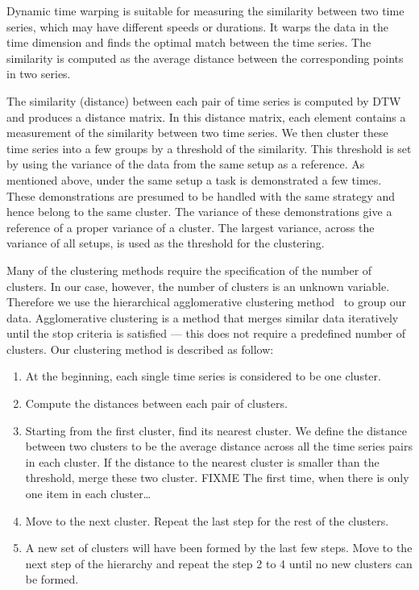 Dynamic time warping is suitable for measuring the similarity between
two time series, which may have different speeds or durations. It
warps the data in the time dimension and finds the optimal match
between the time series. The similarity is computed as the average
distance between the corresponding points in two series.

The similarity (distance) between each pair of time series is computed
by DTW and produces a distance matrix. In this distance matrix, each
element contains a measurement of the similarity between two time
series. We then cluster these time series into a few groups by a
threshold of the similarity. This threshold is set by using the
variance of the data from the same setup as a reference. As mentioned
above, under the same setup a task is demonstrated a few times. These
demonstrations are presumed to be handled with the same strategy and
hence belong to the same cluster. The variance of these demonstrations
give a reference of a proper variance of a cluster. The largest
variance, across the variance of all setups, is used as the threshold
for the clustering.  %

Many of the clustering methods require the specification of the number
of clusters. In our case, however, the number of clusters is an
unknown variable. Therefore we use the hierarchical agglomerative
clustering method~\citep{willett1988recent} to group our
data. Agglomerative clustering is a method that merges similar data
iteratively until the stop criteria is satisfied --- this does not
require a predefined number of clusters. Our clustering method is
described as follow:

\begin{enumerate}
\item At the beginning, each single time series is considered to be one cluster.
\item Compute the distances between each pair of clusters.
\item Starting from the first cluster, find its nearest cluster. We
  define the distance between two clusters to be the average distance
  across all the time series pairs in each cluster. If the distance to the
  nearest cluster is smaller than the threshold, merge these two
  cluster. FIXME  The first time, when there is only one item in each
  cluster\ldots %
\item Move to the next cluster. Repeat the last step for the rest of the clusters.
\item A new set of clusters will have been formed by the last few
  steps.  Move to the next step of the hierarchy and repeat the step 2
  to 4 until no new clusters can be formed.
\end{enumerate}

